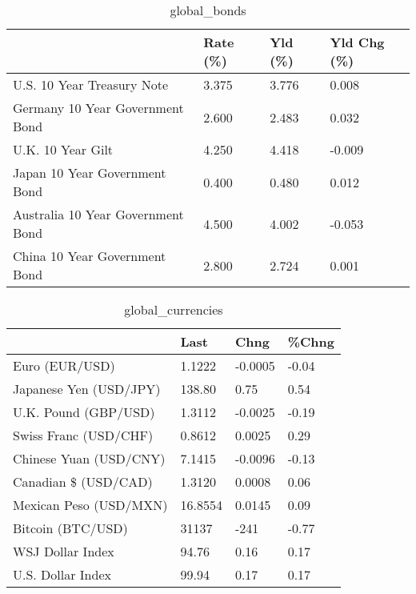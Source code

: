 \documentclass{article}%
\begin{document}
%


\begin{table}[htbp]%
\caption{global\_bonds}%
\centering%
\begin{adjustbox}{width=1\textwidth}%
\begin{tabular}{llll}
\toprule
                                  & Rate (\%) & Yld (\%) & Yld Chg (\%) \\
\midrule
       U.S. 10 Year Treasury Note &    3.375 &   3.776 &       0.008 \\
  Germany 10 Year Government Bond &    2.600 &   2.483 &       0.032 \\
                U.K. 10 Year Gilt &    4.250 &   4.418 &      -0.009 \\
    Japan 10 Year Government Bond &    0.400 &   0.480 &       0.012 \\
Australia 10 Year Government Bond &    4.500 &   4.002 &      -0.053 \\
    China 10 Year Government Bond &    2.800 &   2.724 &       0.001 \\
\bottomrule
\end{tabular}
%
\end{adjustbox}%
\end{table}

%


\begin{table}[htbp]%
\caption{global\_currencies}%
\centering%
\begin{adjustbox}{width=1\textwidth}%
\begin{tabular}{llll}
\toprule
                       &    Last &    Chng & \%Chng \\
\midrule
        Euro (EUR/USD) &  1.1222 & -0.0005 & -0.04 \\
Japanese Yen (USD/JPY) &  138.80 &    0.75 &  0.54 \\
  U.K. Pound (GBP/USD) &  1.3112 & -0.0025 & -0.19 \\
 Swiss Franc (USD/CHF) &  0.8612 &  0.0025 &  0.29 \\
Chinese Yuan (USD/CNY) &  7.1415 & -0.0096 & -0.13 \\
  Canadian \$ (USD/CAD) &  1.3120 &  0.0008 &  0.06 \\
Mexican Peso (USD/MXN) & 16.8554 &  0.0145 &  0.09 \\
     Bitcoin (BTC/USD) &   31137 &    -241 & -0.77 \\
      WSJ Dollar Index &   94.76 &    0.16 &  0.17 \\
     U.S. Dollar Index &   99.94 &    0.17 &  0.17 \\
\bottomrule
\end{tabular}
%
\end{adjustbox}%
\end{table}
\end{document}
